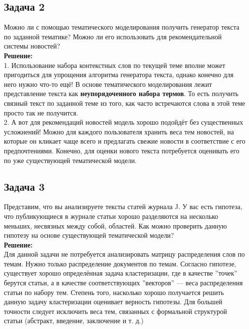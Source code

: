 \subsection*{Задача 2}
Можно ли с помощью тематического моделирования получить генератор текста по заданной тематике? Можно ли его использовать для рекомендательной системы новостей?\\
\textbf{Решение:}\\
1. Использование набора контекстных слов по текущей теме вполне может пригодиться для упрощения алгоритма генератора текста, однако конечно для него нужно что-то ещё! В основе тематического моделирования лежит представление текста как \textbf{неупорядоченного набора термов}. То есть получить связный текст по заданной теме из того, как часто встречаются слова в этой теме просто так не получится. \\
2. А вот для рекомендаций новостей модель хорошо подойдёт без существенных усложнений! Можно для каждого пользователя хранить веса тем новостей, на которые он кликает чаще всего и предлагать свежие новости в соответствие с его предпочтениями. Конечно, для оценки нового текста потребуется оценивать его по уже существующей тематической модели.

\subsection*{Задача 3}
Представим, что вы анализируете тексты статей журнала J. У вас есть гипотеза, что публикующиеся в журнале статьи хорошо разделяются на несколько меньших, несвязных между собой, областей. Как можно проверить данную гипотезу на основе существующей тематической модели?\\
\textbf{Решение:}\\
Для данной задачи не потребуется анализировать матрицу распределения слов по темам. Нужно только распределение документов по темам. Согласно гипотезе, существует хорошо определённая задача кластеризации, где в качестве ''точек'' берутся статьи, а в качестве соответствующих ''векторов'' --- веса распределения статьи по набору тем. Степень того, насколько хорошо получается решить данную задачу кластеризации оценивает верность гипотезы. Для большей точности следует исключить веса тем, связанных с формальной структурой статьи (абстракт, введение, заключение и т. д.)
